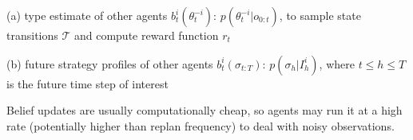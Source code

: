 \documentclass[letterpaper, 10 pt, conference]{ieeeconf}  %
\begin{document}
(a) type estimate of other agents $b^i_t(\theta_t^{-i})$: 
$p(\theta^{-i}_t|o_{0:t})$, to sample state transitions $\mathcal{T}$ and 
compute reward function $r_t$

(b) future strategy profiles of other agents $b^i_t(\sigma_{t:T})$: 
    $p(\sigma_h|I^i_h)$, where $t\leq h\leq T$ is the future time step of interest

Belief updates are usually computationally cheap, so agents may run it at a high 
rate (potentially higher than replan frequency) to deal with noisy 
observations. 
\end{document}
